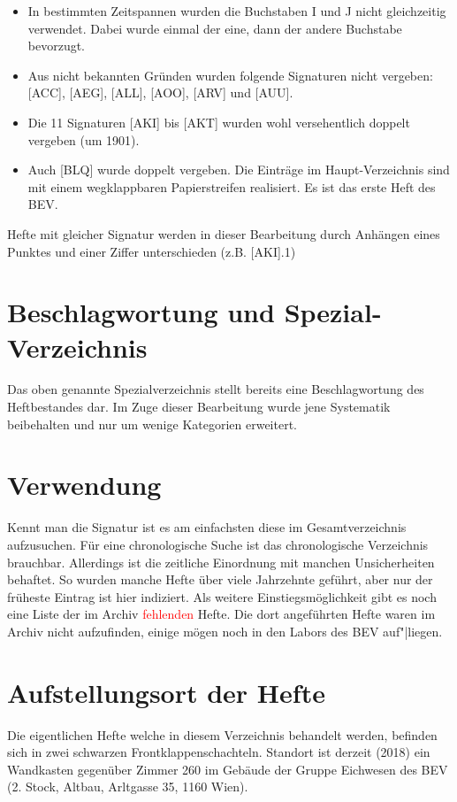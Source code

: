\documentclass[a4paper]{scrbook}
\begin{document}
\begin{itemize}
\item In bestimmten Zeitspannen wurden die Buchstaben I und J nicht gleichzeitig verwendet. Dabei wurde einmal der eine, dann der andere Buchstabe bevorzugt.
\item Aus nicht bekannten Gründen wurden folgende Signaturen nicht vergeben: [ACC], [AEG], [ALL], [AOO], [ARV] und [AUU].
\item Die 11 Signaturen [AKI] bis [AKT] wurden wohl versehentlich doppelt vergeben (um 1901).
\item Auch [BLQ] wurde doppelt vergeben. Die Einträge im Haupt-Verzeichnis sind mit einem wegklappbaren Papierstreifen realisiert. Es ist das erste Heft des BEV.
\end{itemize}
Hefte mit gleicher Signatur werden in dieser Bearbeitung durch Anhängen eines Punktes und einer Ziffer unterschieden (z.B. [AKI].1)

\section{Beschlagwortung und Spezial-Verzeichnis}

Das oben genannte \glqq{}Spezialverzeichnis\grqq{} stellt bereits eine Beschlagwortung des Heftbestandes dar. Im Zuge dieser Bearbeitung wurde jene Systematik beibehalten und nur um wenige Kategorien erweitert.

\section{Verwendung}

Kennt man die Signatur ist es am einfachsten diese im Gesamtverzeichnis aufzusuchen. Für eine chronologische Suche ist das chronologische Verzeichnis brauchbar. Allerdings ist die zeitliche Einordnung mit manchen Unsicherheiten behaftet. So wurden manche Hefte über viele Jahrzehnte geführt, aber nur der früheste Eintrag ist hier indiziert. Als weitere Einstiegsmöglichkeit gibt es noch eine Liste der im Archiv \textcolor{red}{fehlenden} Hefte. Die dort angeführten Hefte waren im Archiv nicht aufzufinden, einige mögen noch in den Labors des BEV auf"|liegen.
  
\section{Aufstellungsort der Hefte}

Die eigentlichen Hefte welche in diesem Verzeichnis behandelt werden, befinden sich in zwei schwarzen Frontklappenschachteln. Standort ist derzeit (2018) ein Wandkasten gegenüber Zimmer 260  im Gebäude der Gruppe Eichwesen des BEV (2. Stock, Altbau, Arltgasse 35, 1160 Wien).
\end{document}
